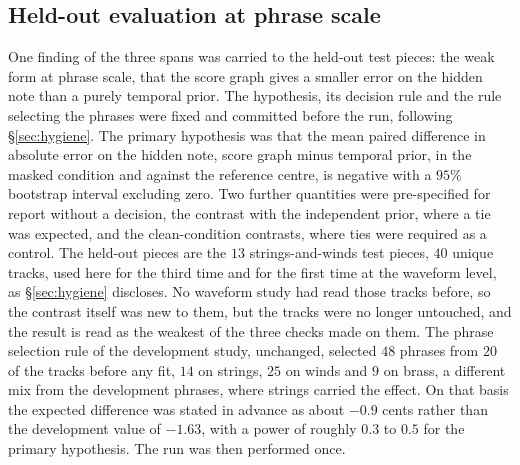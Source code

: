 \subsection{Held-out evaluation at phrase scale}\label{sec:phase3-heldout}
One finding of the three spans was carried to the held-out test pieces:
the weak form at phrase scale, that the score graph gives a smaller error
on the hidden note than a purely temporal prior. The hypothesis, its decision
rule and the rule selecting the phrases were fixed and committed before the run, following
\S\ref{sec:hygiene}. The primary hypothesis was that the mean paired
difference in absolute error on the hidden note, score graph minus
temporal prior, in the masked condition and against the reference
centre, is negative with a $95\%$ bootstrap interval excluding zero. Two
further quantities were pre-specified for report without a decision, the contrast with
the independent prior, where a tie was expected, and the clean-condition
contrasts, where ties were required as a control. The held-out pieces are
the $13$ strings-and-winds test pieces, $40$ unique tracks, used here for
the third time and for the first time at the waveform level, as
\S\ref{sec:hygiene} discloses. No waveform study had read those tracks
before, so the contrast itself was new to them, but the tracks were no
longer untouched, and the result is read as the weakest of the three
checks made on them. The phrase selection rule of the development study, unchanged,
selected $48$ phrases from $20$ of the tracks before any fit, $14$ on
strings, $25$ on winds and $9$ on brass, a different mix from the
development phrases, where strings carried the effect. On that basis the
expected difference was stated in advance as about $-0.9$ cents rather
than the development value of $-1.63$, with a power of roughly $0.3$ to
$0.5$ for the primary hypothesis. The run was then performed once.


